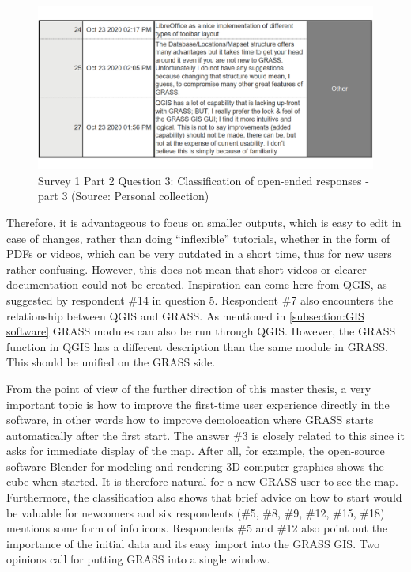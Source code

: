 \documentclass[a4paper,10pt,twoside]{article}
\begin{document}
\newpage
\vspace{0.3cm}
\begin{figure}[hbt!] 
\begin{center}
\includegraphics[width=15cm]{../surveys/analyzed_data/survey1_part2_question3_open_ended-2_1} 
\caption[Survey 1 Part 2 Question 3: Classification of open-ended responses - part 3]{Survey 1 Part 2 Question 3: Classification of open-ended responses - part 3 (Source: Personal collection)}
\label{fig:survey1_part2_question3_open_ended3_1}
\end{center}
\end{figure}

\noindent Therefore, it is advantageous to focus on smaller outputs, which is easy to edit in case of changes, rather than doing ``inflexible'' tutorials, whether in the form of PDFs or videos, which can be very outdated in a short time, thus for new users rather confusing. However, this does not mean that short videos or clearer documentation could not be created. Inspiration can come here from QGIS, as suggested by respondent \#14 in question 5. Respondent \#7 also encounters the relationship between QGIS and GRASS. As mentioned in \ref{subsection:GIS software} GRASS modules can also be run through QGIS. However, the GRASS function in QGIS has a different description than the same module in GRASS. This should be unified on the GRASS side.

From the point of view of the further direction of this master thesis, a very important topic is how to improve the first-time user experience directly in the software, in other words how to improve demolocation where GRASS starts automatically after the first start. The answer \#3 is closely related to this since it asks for immediate display of the map. After all, for example, the open-source software Blender for modeling and rendering 3D computer graphics shows the cube when started. It is therefore natural for a new GRASS user to see the map. Furthermore, the classification also shows that brief advice on how to start would be valuable for newcomers and six respondents (\#5, \#8, \#9, \#12, \#15, \#18) mentions some form of info icons. Respondents \#5 and \#12 also point out the importance of the initial data and its easy import into the GRASS GIS. Two opinions call for putting GRASS into a single window.
\end{document}
